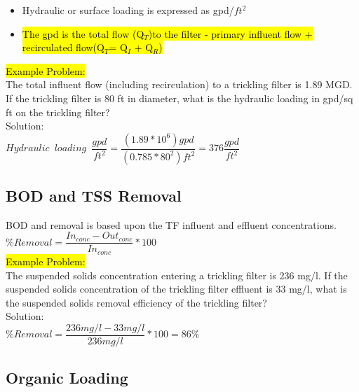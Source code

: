 \begin{itemize}
\item Hydraulic or surface loading is expressed as gpd/$ft^2$
\item \hl{The gpd is the total flow (Q$_T$)to the filter - primary influent flow + recirculated flow(Q$_T$= Q$_I$ + Q$_R$)}\\
\end{itemize}
			\hl{Example Problem:}\\
The total influent flow (including recirculation) to a trickling filter is 1.89 MGD. If the trickling filter is 80 ft in diameter, what is the hydraulic loading in gpd/sq ft on the trickling filter?\\
\vspace{0.2cm}
Solution:\\
\vspace{0.2cm}
$Hydraulic \enspace loading \enspace \dfrac{gpd}{ft^2}=\dfrac{(1.89*10^6)gpd}{(0.785*80^2)ft^2} =\boxed{376\dfrac{gpd}{ft^2}}$
			
			
\subsection{BOD and TSS Removal}
BOD and  removal is based upon the TF influent and effluent concentrations.\\
\vspace{0.2cm}
$\% Removal=\dfrac{In_{conc}-Out_{conc}}{In_{conc}}*100$\\
			\hl{Example Problem:}\\
The suspended solids concentration entering a trickling filter is 236 mg/l. If the suspended solids concentration of the trickling filter effluent is 33 mg/l, what is the suspended solids removal efficiency of the trickling filter?\\
\vspace{0.2cm}
Solution:\\
\vspace{0.2cm}
$\% Removal=\dfrac{236 mg/l-33 mg/l}{236 mg/l}*100=\boxed{86\%}$

\subsection{Organic Loading}


